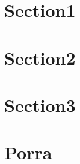 \documentclass[12pt]{article}
\begin{document}
\tableofcontents
\clearpage
\section{Section1}
\lipsum[4-8]
\newpage
\section*{Section2}
\lipsum[4-8]
\newpage
\section{Section3}
\lipsum[4-8]
\newpage
\section*{Porra}
\lipsum[4-8]
\end{document}
